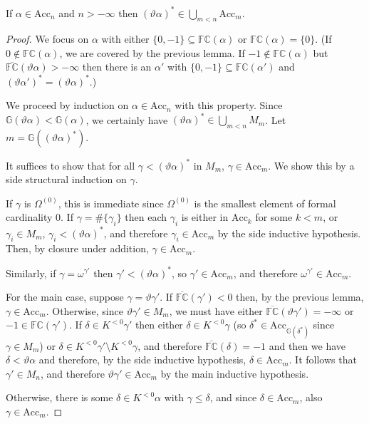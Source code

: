 \documentclass[10pt,a4paper]{amsart}
\begin{document}
\begin{lemma}
  If $\alpha\in\mathrm{Acc}_n$ and $n>-\infty$ then $(\vartheta\alpha)^*\in\bigcup_{m<n}\mathrm{Acc}_m$.
\end{lemma}

\begin{proof}
We focus on $\alpha$ with either $\{0,-1\}\subseteq\mathbb{FC}(\alpha)$ or $\mathbb{FC}(\alpha)=\{0\}$. (If $0\not\in\mathbb{FC}(\alpha)$, we are covered by the previous lemma. If $-1\not\in\mathbb{FC}(\alpha)$ but $\overline{\mathbb{FC}}(\vartheta\alpha)>-\infty$ then there is an $\alpha'$ with $\{0,-1\}\subseteq\mathbb{FC}(\alpha')$ and $(\vartheta\alpha')^*=(\vartheta\alpha)^*$.)

We proceed by induction on $\alpha\in\mathrm{Acc}_n$ with this property. Since $\mathbb{G}(\vartheta\alpha)<\mathbb{G}(\alpha)$, we certainly have $(\vartheta\alpha)^*\in\bigcup_{m<n}M_m$. Let $m=\mathbb{G}((\vartheta\alpha)^*)$.
  
  It suffices to show that for all $\gamma<(\vartheta\alpha)^*$ in $M_m$, $\gamma\in\mathrm{Acc}_m$. We show this by a side structural induction on $\gamma$.

  If $\gamma$ is $\Omega^{(0)}$, this is immediate since $\Omega^{(0)}$ is the smallest element of formal cardinality $0$. If $\gamma=\#\{\gamma_i\}$ then each $\gamma_i$ is either in $\mathrm{Acc}_k$ for some $k<m$, or $\gamma_i\in M_m$, $\gamma_i<(\vartheta\alpha)^*$, and therefore $\gamma_i\in\mathrm{Acc}_m$ by the side inductive hypothesis. Then, by closure under addition, $\gamma\in\mathrm{Acc}_m$.

  Similarly, if $\gamma=\omega^{\gamma'}$ then $\gamma'<(\vartheta\alpha)^*$, so $\gamma'\in\mathrm{Acc}_m$, and therefore $\omega^{\gamma'}\in\mathrm{Acc}_m$.

  For the main case, suppose $\gamma=\vartheta\gamma'$. If $\overline{\mathbb{FC}}(\gamma')<0$ then, by the previous lemma, $\gamma\in\mathrm{Acc}_m$. Otherwise, since $\vartheta\gamma'\in M_m$, we must have either $\overline{\mathbb{FC}}(\vartheta\gamma')=-\infty$ or $-1\in \mathbb{FC}(\gamma')$. If $\delta\in K^{< 0}\gamma'$ then either $\delta\in K^{< 0}\gamma$ (so $\delta^*\in\mathrm{Acc}_{\mathbb{G}(\delta^*)}$ since $\gamma\in M_m$) or $\delta\in K^{< 0}\gamma'\setminus K^{< 0}\gamma$, and therefore $\overline{\mathbb{FC}}(\delta)=-1$ and then we have $\delta<\vartheta\alpha$ and therefore, by the side inductive hypothesis, $\delta\in\mathrm{Acc}_m$. It follows that $\gamma'\in M_n$, and therefore $\vartheta\gamma'\in\mathrm{Acc}_m$ by the main inductive hypothesis.%
  
  Otherwise, there is some $\delta\in K^{< 0}\alpha$ with $\gamma\leq\delta$, and since $\delta\in\mathrm{Acc}_m$, also $\gamma\in\mathrm{Acc}_m$.
\end{proof}
\end{document}
